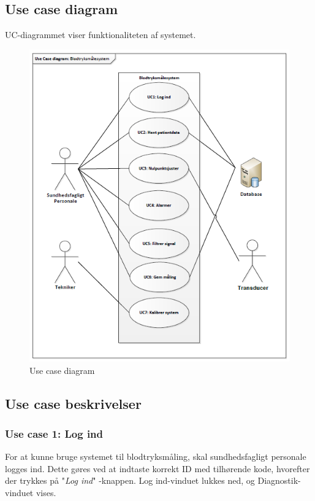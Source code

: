 \subsection{Use case diagram}
UC-diagrammet viser funktionaliteten af systemet.
\begin{figure}[H]
\centering
\includegraphics[scale=0.95]{uc.PNG}
\caption{Use case diagram}
\end{figure}

\subsection{Use case beskrivelser}


\subsubsection{Use case 1: Log ind}
For at kunne bruge systemet til blodtryksmåling, skal sundhedsfagligt personale logges ind. Dette gøres ved at indtaste korrekt ID med tilhørende kode, hvorefter der trykkes på "\textit{Log ind}"\- -knappen. Log ind-vinduet lukkes ned, og Diagnostik-vinduet vises. 


